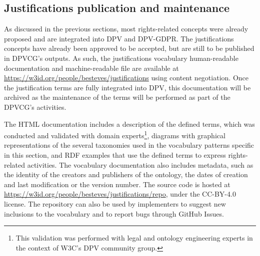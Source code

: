 \subsection{Justifications publication and maintenance}
\label{sec:justifications_publication}

As discussed in the previous sections, most rights-related concepts were already proposed and are integrated into DPV and DPV-GDPR.
The justifications concepts have already been approved to be accepted, but are still to be published in DPVCG's outputs.
As such, the justifications vocabulary human-readable documentation and machine-readable file are available at \url{https://w3id.org/people/besteves/justifications} using content negotiation.
Once the justification terms are fully integrated into DPV, this documentation will be archived as the maintenance of the terms will be performed as part of the DPVCG's activities.

The HTML documentation includes a description of the defined terms, which was conducted and validated with domain experts\footnote{This validation was performed with legal and ontology engineering experts in the context of W3C's DPV community group.}, diagrams with graphical representations of the several taxonomies used in the vocabulary patterns specific in this section, and RDF examples that use the defined terms to express rights-related activities.
The vocabulary documentation also includes metadata, such as the identity of the creators and publishers of the ontology, the dates of creation and last modification or the version number.
The source code is hosted at \url{https://w3id.org/people/besteves/justifications/repo}, under the CC-BY-4.0 license.
The repository can also be used by implementers to suggest new inclusions to the vocabulary and to report bugs through GitHub Issues.